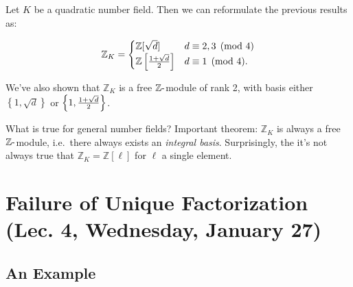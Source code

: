 \begin{remark}

Let \(K\) be a quadratic number field. Then we can reformulate the
previous results as:

\begin{align*}
{\mathbb{Z}}_K = 
\begin{cases}
{\mathbb{Z}}[ \sqrt{d} ] &  d \equiv 2,3 \pmod 4
\\
{\mathbb{Z}}\left[{1 + \sqrt{d} \over 2}\right] & d \equiv 1 \pmod 4.
\end{cases}
\end{align*}

We've also shown that \({\mathbb{Z}}_K\) is a free
\({\mathbb{Z}}{\hbox{-}}\)module of rank 2, with basis either
\(\left\{{ 1, \sqrt{d} }\right\}\) or
\(\left\{{ 1, {1 + \sqrt{d} \over 2 } }\right\}\).

\end{remark}

\begin{remark}

What is true for general number fields? Important theorem:
\({\mathbb{Z}}_K\) is always a free \({\mathbb{Z}}{\hbox{-}}\)module,
i.e.~there always exists an \emph{integral basis}. Surprisingly, the
it's not always true that \({\mathbb{Z}}_K = {\mathbb{Z}}[\ell]\) for
\(\ell\) a single element.

\end{remark}

\hypertarget{failure-of-unique-factorization-lec.-4-wednesday-january-27}{%
\section{Failure of Unique Factorization (Lec. 4, Wednesday, January
27)}\label{failure-of-unique-factorization-lec.-4-wednesday-january-27}}

\hypertarget{an-example}{%
\subsection{An Example}\label{an-example}}

